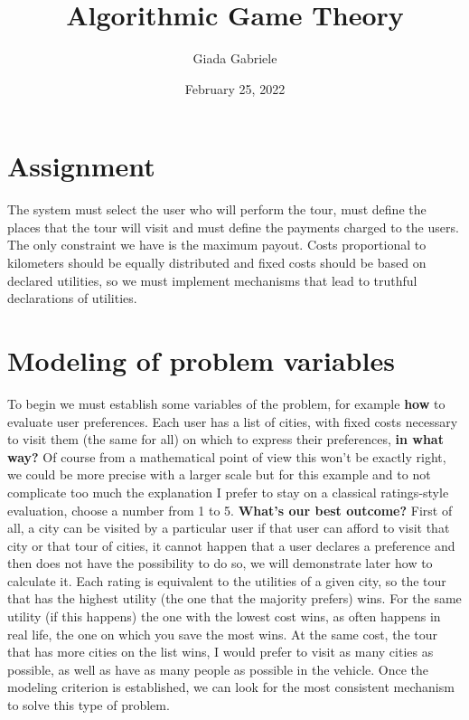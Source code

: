 \documentclass{article}
\title{Algorithmic Game Theory}
\author{Giada Gabriele}
\date{February 25, 2022}
\begin{document}
\maketitle
\section{Assignment}
\Large{
The system must select the user who will perform the tour, must define the places that the tour will visit and must define the payments charged to the users. The only constraint we have is the maximum payout. Costs proportional to kilometers should be equally distributed and fixed costs should be based on declared utilities, so we must implement mechanisms that lead to truthful declarations of utilities.
}
\section{Modeling of problem variables}
\Large{
To begin we must establish some variables of the problem, for example \textbf{how} to evaluate user preferences. Each user has a list of cities, with fixed costs necessary to visit them (the same for all) on which to express their preferences, \textbf{in what way?} Of course from a mathematical point of view this won't be exactly right, we could be more precise with a larger scale but for this example and to not complicate too much the explanation I prefer to stay on a classical ratings-style evaluation, choose a number from 1 to 5. \textbf{What's our best outcome?} First of all, a city can be visited by a particular user if that user can afford to visit that city or that tour of cities, it cannot happen that a user declares a preference and then does not have the possibility to do so, we will demonstrate later how to calculate it. Each rating is equivalent to the utilities of a given city, so the tour that has the highest utility (the one that the majority prefers) wins. For the same utility (if this happens) the one with the lowest cost wins, as often happens in real life, the one on which you save the most wins. At the same cost, the tour that has more cities on the list wins, I would prefer to visit as many cities as possible, as well as have as many people as possible in the vehicle. Once the modeling criterion is established, we can look for the most consistent mechanism to solve this type of problem.
}
\end{document}
